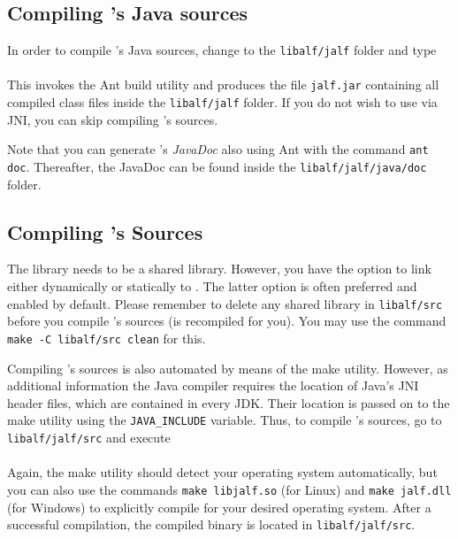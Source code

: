 \subsection{Compiling \jalf's Java sources}
In order to compile \jalf's Java sources, change to the \texttt{libalf/jalf} folder and type

\paragraph{}
This invokes the Ant build utility and produces the file \texttt{jalf.jar} containing all compiled class files inside the \texttt{libalf/jalf} folder. If you do not wish to use \jalf via JNI, you can skip compiling \jalf's \cpp sources.

Note that you can generate \jalf's \emph{JavaDoc} also using Ant with the command \texttt{ant doc}. Thereafter, the JavaDoc can be found inside the \texttt{libalf/jalf/java/doc} folder.

\subsection{\texorpdfstring{Compiling \jalf's \cpp Sources}{Compiling jALF's C++ Sources}}
The \jalf \cpp library needs to be a shared library. However, you have the option to link \libalf either dynamically or statically to \jalf. The latter option is often preferred and enabled by default. Please remember to delete any shared library in \texttt{libalf/src} before you compile \jalf's \cpp sources (\libalf is recompiled for you). You may use the command \texttt{make -C libalf/src clean} for this.

Compiling \jalf's \cpp sources is also automated by means of the make utility. However, as additional information the Java compiler requires the location of Java's JNI header files, which are contained in every JDK. Their location is passed on to the make utility using the \texttt{JAVA\_INCLUDE} variable. Thus, to compile \jalf's \cpp sources, go to \texttt{libalf/jalf/src} and execute


\paragraph{}
Again, the make utility should detect your operating system automatically, but you can also use the commands \texttt{make libjalf.so} (for Linux) and \texttt{make jalf.dll} (for Windows) to explicitly compile \jalf for your desired operating system. After a successful compilation, the compiled binary is located in \texttt{libalf/jalf/src}.

